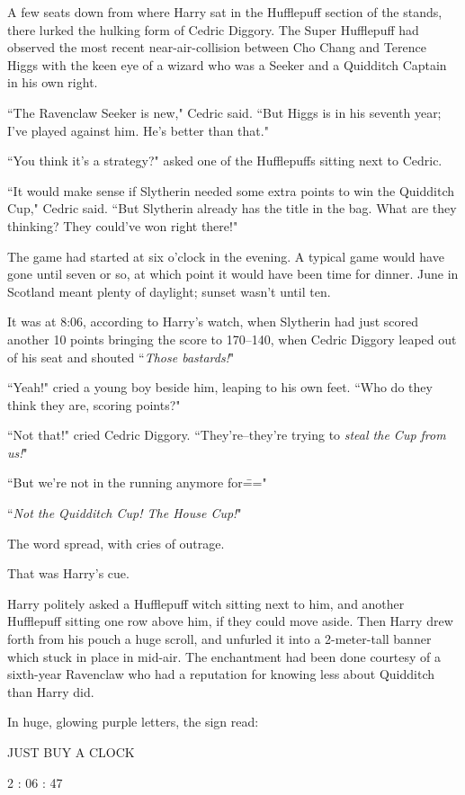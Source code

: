 A few seats down from where Harry sat in the Hufflepuff section of the stands, there lurked the hulking form of Cedric Diggory. The Super Hufflepuff had observed the most recent near-air-collision between Cho Chang and Terence Higgs with the keen eye of a wizard who was a Seeker and a Quidditch Captain in his own right.

``The Ravenclaw Seeker is new," Cedric said. ``But Higgs is in his seventh year; I've played against him. He's better than that."

``You think it's a strategy?" asked one of the Hufflepuffs sitting next to Cedric.

``It would make sense if Slytherin needed some extra points to win the Quidditch Cup," Cedric said. ``But Slytherin already has the title in the bag. What are they thinking? They could've won right there!"

The game had started at six o'clock in the evening. A typical game would have gone until seven or so, at which point it would have been time for dinner. June in Scotland meant plenty of daylight; sunset wasn't until ten.

It was at 8:06\pm, according to Harry's watch, when Slytherin had just scored another 10 points bringing the score to 170--140, when Cedric Diggory leaped out of his seat and shouted ``\emph{Those bastards!}"

``Yeah!" cried a young boy beside him, leaping to his own feet. ``Who do they think they are, scoring points?"

``Not that!" cried Cedric Diggory. ``They're\---they're trying to \emph{steal the Cup from us!}"

``But we're not in the running anymore for\==="

``\emph{Not the Quidditch Cup! The House Cup!}"

The word spread, with cries of outrage.

That was Harry's cue.

Harry politely asked a Hufflepuff witch sitting next to him, and another Hufflepuff sitting one row above him, if they could move aside. Then Harry drew forth from his pouch a huge scroll, and unfurled it into a 2-meter-tall banner which stuck in place in mid-air. The enchantment had been done courtesy of a sixth-year Ravenclaw who had a reputation for knowing less about Quidditch than Harry did.

In huge, glowing purple letters, the sign read:

\begin{center}
JUST BUY A CLOCK

2 : 06 : 47
\end{center}

